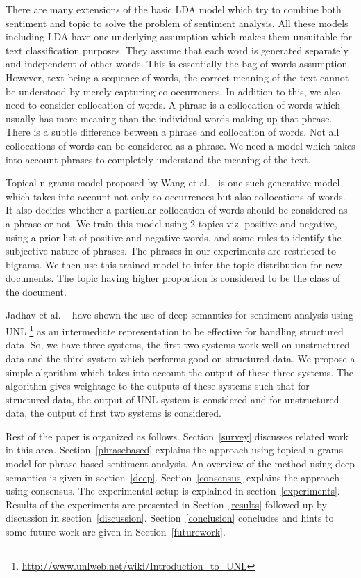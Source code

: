\documentclass[11pt]{article}
\begin{document}
There are many extensions of the basic LDA model which try to combine both sentiment 
and topic to solve the problem of sentiment analysis. All these models including LDA 
have one underlying assumption which makes them unsuitable for text classification
purposes. They assume that each word is generated separately and independent of other 
words. This is essentially the bag of words assumption. However, text being a sequence 
of words, the correct meaning of the text cannot be understood by merely capturing
co-occurrences. In addition to this, we also need to consider collocation of words.
A phrase is a collocation of words which usually has more meaning than the individual
words making up that phrase. There is a subtle difference between a phrase and collocation
of words. Not all collocations of words can be considered as a phrase. We need a 
model which takes into account phrases to completely understand the meaning of the text.

Topical n-grams model proposed by Wang et al.~ is one such generative 
model which takes into account not only co-occurrences but also collocations of words. It 
also decides whether a particular collocation of words should be considered as a phrase or not. 
We train this model using 2 topics viz. positive and negative, using a prior list of positive 
and negative words, and some rules to identify the subjective nature of phrases. The phrases
in our experiments are restricted to bigrams. We then use this trained model to infer the topic
distribution for new documents. The topic having higher proportion is considered to be
the class of the document.

Jadhav et al. ~ have shown the use of deep semantics for 
sentiment analysis using UNL \footnote{\url{http://www.unlweb.net/wiki/Introduction_to_UNL}}
as an intermediate representation to be effective for handling structured data. So, we have
three systems, the first two systems work well on unstructured data and the third system 
which performs good on structured data. We propose a simple algorithm which takes into 
account the output of these three systems. The algorithm gives weightage to the outputs
of these systems such that for structured data, the output of UNL system is considered
and for unstructured data, the output of first two systems is considered.

Rest of the paper is organized as follows. Section~\ref{survey} discusses related work
in this area. Section~\ref{phrasebased} explains the approach using topical n-grams model
for phrase based sentiment analysis. An overview of the method using deep semantics is
given in section~\ref{deep}. Section~\ref{consensus} explains the approach using consensus.
The experimental setup is explained in section~\ref{experiments}. Results of the experiments
are presented in Section~\ref{results} followed up by discussion in section~\ref{discussion}.
Section~\ref{conclusion} concludes and  hints to some future work are given in Section~\ref{futurework}.
\end{document}
